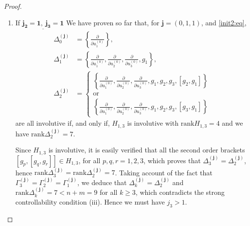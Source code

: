 \documentclass[10pt]{article}
\newcommand{\3}{\mathbf{3}}
\newcommand{\2}{\mathbf{2}}
\newcommand{\1}{\mathbf{1}}
\newcommand{\0}{\mathbf{0}}
\newcommand{\mbf}[1]{\mathbf{#1}}
\newcommand{\rk}{\mathrm{rank}}
\newcommand{\ddu}[2]{\frac{\partial}{\partial u_{#1}^{(#2)}}}
\newcommand{\ol}[1]{\overline{#1}}
\begin{document}
\begin{proof}
\begin{enumerate}
\paragraph{If $\underline{\mathbf{j_{3} \geq j_{2}\geq 3}}$}
$$\begin{aligned}
&\Gamma_{2}^{(\mbf{j})} = \left\{ \ddu{2}{j_{2}},  \ddu{2}{j_{2}-1}, \ddu{2}{j_{2}-2}, \ddu{3}{j_{3}}, \ddu{3}{j_{3}-1}, \ddu{3}{j_{3}-2}  \right\}, \\
&\Delta_{2}^{(\mbf{j})} = \left\{\ddu{1}{0},  g_{1},  u_{2}^{(0)}[g_{2},g_{1}]+ u_{3}^{(0)}[g_{3},g_{1}] \right\}.
\end{aligned}$$
As before, $\Delta_{2}^{(\mbf{j})}$ is involutive if, and only if, $H_{1,1}$ is involutive, with $\rk H_{1,1} =2$, in which case
$$\Delta_{2}^{(\mbf{j})} = \left\{\ddu{1}{0}, g_{1}, [g_{2},g_{1}], [g_{3},g_{1}]\right\}= \ol{\Delta_{2}^{(\mbf{j})}}, \quad \rk \Delta_{2}^{(\mbf{j})} = 3,$$
with $[\Gamma_{2}^{(\mbf{j})}, \Delta_{2}^{(\mbf{j})}] = \{ 0 \} \subset \Delta_{2}^{(\mbf{j})}.$

\item[\framebox{\Large{$\mathbf{k=3}$}}]
If $\underline{\mathbf{ j_{2}=1,~j_{3}= 1}}$
%
We have proven so far that, for $\mbf{j}=(0,1,1)$, and \eqref{init2:eq},
$$\begin{aligned}
\Delta_{0}^{(\mbf{j})} &= \left\{\ddu{1}{0}\right\},\\
\Delta_{1}^{(\mbf{j})} &= \left\{\ddu{1}{0}, \ddu{2}{0}, \ddu{3}{0}, g_{1} \right\},\\
\Delta_{2}^{(\mbf{j})} &=\left\{ \begin{array}{l}
 \left\{\ddu{1}{0}, \ddu{2}{0}, \ddu{3}{0}, g_{1}, g_{2}, g_{3}, [g_{2},g_{1}]\right\}\\
 \mathrm{or}\\
  \left\{\ddu{1}{0}, \ddu{2}{0}, \ddu{3}{0}, g_{1}, g_{2}, g_{3}, [g_{3},g_{1}]\right\}
  \end{array}\right.
\end{aligned}$$
are all involutive if, and only if, $H_{1,3}$ is involutive with $\rk H_{1,3} = 4$ and we have $\rk \Delta_{2}^{(\mbf{j})} = 7$.

Since $H_{1,3}$ is involutive, it is easily verified that all the second order brackets $[g_{p},[g_{q},g_{r}]] \in H_{1,3}$, for all $p,q,r=1,2,3$, which proves that $\Delta_{3}^{(\mbf{j})} =\Delta_{2}^{(\mbf{j})}$, hence $\rk \Delta_{3}^{(\mbf{j})} = \rk \Delta_{2}^{(\mbf{j})}= 7$. Taking account of the fact that $\Gamma_{3}^{(\mbf{j})} =\Gamma_{2}^{(\mbf{j})} =\Gamma_{1}^{(\mbf{j})}$, we deduce that $\Delta_{k}^{(\mbf{j})} =\Delta_{2}^{(\mbf{j})}$ and $\rk \Delta_{k}^{(\mbf{j})} = 7 < n+m = 9$ for all $k \geq 3$, which contradicts the strong controllability condition (iii). Hence we must have $j_{3} >1$.


\end{enumerate}
\end{proof}
\end{document}
